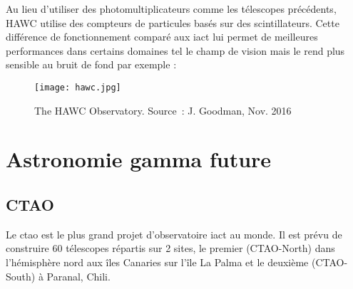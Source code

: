 Au lieu d'utiliser des photomultiplicateurs comme les télescopes précédents, HAWC utilise des compteurs de particules basés sur des scintillateurs.
Cette différence de fonctionnement comparé aux \gls{iact} lui permet de meilleures performances dans certains domaines tel le champ de vision mais le rend plus sensible au bruit de fond par exemple :

\begin{table}[tbph!]
\end{table}

\begin{figure}[tbph!]
	\centering
	\texttt{[image: hawc.jpg]}
	\caption[The HAWC Observatory]{The HAWC Observatory. Source : J. Goodman, Nov. 2016 \cite{Hawc}}
\end{figure}

\section{Astronomie gamma future}
\subsection{CTAO}
Le \gls{ctao} est le plus grand projet d'observatoire \gls{iact} au monde. Il est prévu de construire 60 télescopes répartis sur 2 sites, 
le premier (CTAO-North) dans l'hémisphère nord aux îles Canaries sur l'île La Palma et le deuxième (CTAO-South) à Paranal, Chili.


